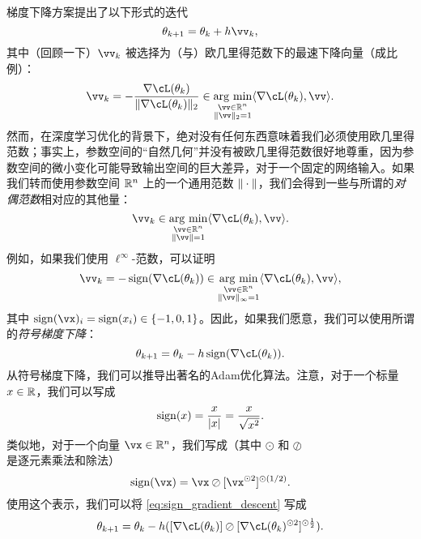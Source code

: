 \documentclass[../../book-main.tex]{subfiles}
\begin{document}
梯度下降方案提出了以下形式的迭代
\begin{equation}
    \theta_{k + 1} = \theta_{k} + h\vv_{k},
\end{equation}
其中（回顾一下）\(\vv_{k}\) 被选择为（与）欧几里得范数下的最速下降向量（成比例）：
\begin{equation}
    \vv_{k} = -\frac{\nabla \cL(\theta_{k})}{\norm{\nabla \cL(\theta_{k})}_{2}} \in \argmin_{\substack{\vv \in \R^{n} \\ \norm{\vv}_{2} = 1}}\ip{\nabla \cL(\theta_{k})}{\vv}.
\end{equation}
然而，在深度学习优化的背景下，绝对没有任何东西意味着我们必须使用欧几里得范数；事实上，参数空间的“自然几何”并没有被欧几里得范数很好地尊重，因为参数空间的微小变化可能导致输出空间的巨大差异，对于一个固定的网络输入。如果我们转而使用参数空间 \(\mathbb{R}^{n}\) 上的一个通用范数 \(\norm{\cdot}\)，我们会得到一些与所谓的\textit{对偶范数}相对应的其他量：
\begin{equation}
    \vv_{k} \in \argmin_{\substack{\vv \in \R^{n} \\ \norm{\vv} = 1}}\ip{\nabla \cL(\theta_{k})}{\vv}.
\end{equation}
例如，如果我们使用 \(\ell^{\infty}\)-范数，可以证明
\begin{equation}
    \vv_{k} = -\sign(\nabla \cL(\theta_{k})) \in \argmin_{\substack{\vv \in \R^{n} \\ \norm{\vv}_{\infty} = 1}}\ip{\nabla \cL(\theta_{k})}{\vv},
\end{equation}
其中 \(\sign(\vx)_{i} = \sign(x_{i}) \in \{-1, 0, 1\}\)。因此，如果我们愿意，我们可以使用所谓的\textit{符号梯度下降}：
\begin{equation}\label{eq:sign_gradient_descent}
    \theta_{k + 1} = \theta_{k} - h\sign(\nabla \cL(\theta_{k})).
\end{equation}
从符号梯度下降，我们可以推导出著名的Adam优化算法。注意，对于一个标量 \(x \in \mathbb{R}\)，我们可以写成
\begin{equation}
    \sign(x) = \frac{x}{\abs{x}} = \frac{x}{\sqrt{x^{2}}}.
\end{equation}
类似地，对于一个向量 \(\vx \in \R^{n}\)，我们写成（其中 \(\odot\) 和 \(\oslash\) 是逐元素乘法和除法）
\begin{equation}
    \sign(\vx) = \vx \oslash [\vx^{\odot 2}]^{\odot (1/2)}.
\end{equation}
使用这个表示，我们可以将 \eqref{eq:sign_gradient_descent} 写成
\begin{equation}
    \theta_{k + 1} = \theta_{k} - h ([\nabla \cL(\theta_{k})] \oslash [\nabla \cL(\theta_{k})^{\odot 2}]^{\odot \frac{1}{2}}).
\end{equation}
\end{document}
